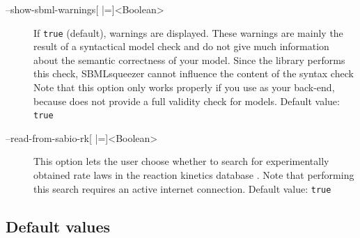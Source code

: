 \begin{description}
\item[--show-sbml-warnings{[} |={]}<Boolean>]
  If \texttt{true} (default), \SBML warnings are displayed. These warnings are
  mainly the result of a syntactical model check and do not give much
  information about the semantic correctness of your model.
  Since the \SBML library performs this check, SBMLsqueezer cannot influence the
  content of the syntax check Note that this option only works properly if you
  use \libSBML as your \SBML back-end, because \JSBML does not provide a full
  validity check for \SBML models.
  Default value: \texttt{true}

\item[--read-from-sabio-rk{[} |={]}<Boolean>]
  This option lets the user choose whether to search for experimentally
  obtained rate laws in the reaction kinetics database \SABIO. Note that
  performing this search requires an active internet connection.
  Default value: \texttt{true}
\end{description}

\subsection{Default values}

